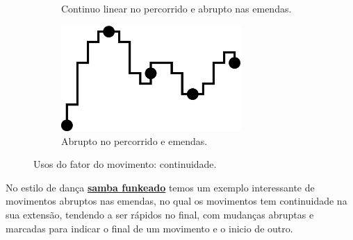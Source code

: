 \begin{figure}[!h]
\begin{subfigure}[b]{0.35\textwidth}
         \caption{Continuo linear no percorrido e abrupto nas emendas.}
         \label{fig:continudade-c}
     \end{subfigure}
     \hfill
     \begin{subfigure}[b]{0.35\textwidth}
         \centering
         \includegraphics[width=0.75\textwidth]{chapters/cap-musicalidade/continudade-d.eps}
         \caption{Abrupto no percorrido e emendas.}
         \label{fig:continudade-d}
     \end{subfigure}
\caption{Usos do fator do movimento: continuidade.}
\label{fig:continudade-all}
\end{figure}

\begin{example}
No estilo de dança \hyperref[subsec:sambafunkeado]{\textbf{samba funkeado}} temos
um exemplo interessante de movimentos abruptos nas emendas,
no qual os movimentos tem continuidade na sua extensão, tendendo a ser rápidos no final,
com mudanças abruptas e marcadas para indicar o final de um movimento e o inicio de outro.
\end{example}


